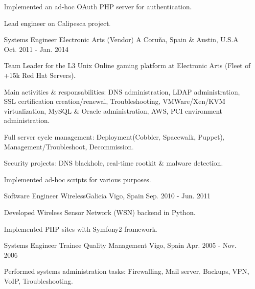 \begin{cventries}
{\begin{cvitems}
        \item {Implemented an ad-hoc OAuth PHP server for authentication.}
        \item {Lead engineer on Calipesca project.}
      \end{cvitems}
    }
  \cventry
    {Systems Engineer} %
    {Electronic Arts (Vendor)} %
    {A Coruña, Spain \& Austin, U.S.A} %
    {Oct. 2011 - Jan. 2014} %
    {
      \begin{cvitems} %
        \item {Team Leader for the L3 Unix Online gaming platform at Electronic Arts (Fleet of +15k Red Hat Servers).}
        \item {Main activities \& responsabilities: DNS administration, LDAP administration, SSL certification creation/renewal, Troubleshooting, VMWare/Xen/KVM virtualization, MySQL \& Oracle administration, AWS, PCI environment administration. }
	\item {Full server cycle management: Deployment(Cobbler, Spacewalk, Puppet), Management/Troubleshoot, Decommission.} 
	\item {Security projects: DNS blackhole, real-time rootkit \& malware detection.} 
	\item {Implemented ad-hoc scripts for various purposes.} 
      \end{cvitems}
    }
  \cventry
    {Software Engineer} %
    {WirelessGalicia} %
    {Vigo, Spain} %
    {Sep. 2010 - Jun. 2011} %
    {
      \begin{cvitems} %
        \item {Developed Wireless Sensor Network (WSN) backend in Python.}
        \item {Implemented PHP sites with Symfony2 framework.}
      \end{cvitems} 
    }
  \cventry
    {Systems Engineer Trainee} %
    {Quality Management} %
    {Vigo, Spain} %
    {Apr. 2005 - Nov. 2006} %
    {
      \begin{cvitems} %
        \item {Performed systems administration tasks: Firewalling, Mail server, Backups, VPN, VoIP, Troubleshooting.}
      \end{cvitems}
    }

\end{cventries}
